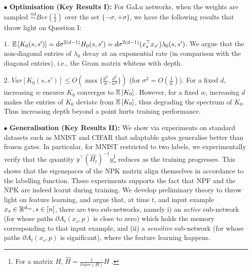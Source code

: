 \documentclass{article}
\begin{document}
$\bullet$ \textbf{Optimisation (Key Results I):} For GaLu networks, when the weights are sampled $\stackrel{iid}\sim Ber(\frac{1}{2})$ over the set $\{-\sigma,+\sigma\}$, we have the following results that throw light on Question I: 

$1.$ $\mathbb{E}\left[K_0(s,s')\right]=d\sigma^{2(d-1)}H_0(s,s')=d\sigma^{2(d-1)}(x_s^\top x_{s'})\lambda_0(s,s')$. We argue that the non-diagonal entries of $\lambda_0$ decay at an exponential rate (in comparison with the diagonal entries), i.e., the Gram matrix whitens with depth.

$2.$ $Var\left[K_0(s,s')\right]\leq O(\max\{\frac{d^2}{w}, \frac{d^3}{w^2}\})$ (for $\sigma^2=O(\frac{1}w)$). For a fixed $d$, increasing $w$ ensures $K_0$ converges to $\mathbb{E}\left[K_0\right]$. However, for a fixed $w$, increasing $d$ makes the entries of $K_0$ deviate from $\mathbb{E}\left[K_0\right]$, thus degrading the spectrum of $K_0$. Thus increasing depth beyond a point hurts training performance.



$\bullet$ \textbf{Generalisation (Key Results II):} We show via experiments on standard datasets such as MNIST and CIFAR that adaptable gates generalise better than frozen gates. In particular, for MNIST restricted to two labels, we experimentally verify that the quantity $y^\top (\widehat{H_t})^{-1}y$\footnote{For a matrix $H$, $\hat{H}=\frac{1}{trace(H)}H$ .} reduces as the training progresses. This shows that the eigenspaces of the NPK matrix align themselves in accordance to the labelling function. These experiments supports the fact that NPF and the NPK are indeed learnt during training. We develop preliminary theory to throw light on feature learning, and argue that, at time $t$, and input example $x_s\in \mathbb{R}^{d_{in}},s\in[n]$, there are two sub-networks, namely i) an \emph{active} sub-network (for whose paths $\partial A_t(x_s,p)$ is close to zero) which holds the memory corresponding to that input example, and (ii) a \emph{sensitive} sub-network (for whose paths $\partial A_t(x_s,p)$ is significant), where the feature learning happens.
\end{document}
